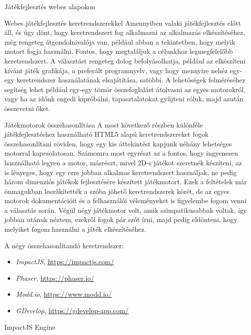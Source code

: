 \begin{MyChapter}{Játékfejlesztés webes alapokon}
\begin{MySection}{Webes játékfejlesztés keretrendszerekkel}
		Amennyiben valaki játékfejlesztés előtt áll, és úgy dönt, hogy keretrendszert fog alkalmazni az alkalmazás elkészítéséhez, még rengeteg átgondolnivalója van, például abban a tekintetben, hogy melyik motort fogja használni. Fontos, hogy megtaláljuk a célunkhoz legmegfelelőbb keretrendszert. A választást rengeteg dolog befolyásolhatja, például az elkészíteni kívánt játék grafikája, a preferált programnyelv, vagy hogy mennyire nehéz egy-egy keretrendszer használatának elsajátítása, satöbbi. A lehetőségek felméréséhez segítség lehet például egy-egy tömör összefoglalást átolvasni az egyes motorokról, vagy ha az időnk engedi kipróbálni, tapasztalatokat gyűjteni róluk, majd azután összevetni őket.
		
		\begin{MySubSection}{Játékmotorok összehasonlítása}
			A most következő részben különféle játékfejlesztéshez használható HTML5 alapú keretrendszereket fogok összehasonlítani röviden, hogy egy kis áttekintést kapjunk néhány lehetséges motorral kapcsolatosan. Számomra most egyrészt az a fontos, hogy ingyenesen használható legyen a motor, másrészt, mivel 2D-s játékot szeretnék készíteni, az is lényeges, hogy egy erre jobban alkalmas keretrendszert használjak, ne pedig három dimenziós játékok fejlesztésére készített játékmotort. 
			Ezek a feltételek már önmagukban leszűkítették a szóba jöhető keretrendszerek körét, de az egyes motorok dokumentációit és a felhasználói véleményeket is figyelembe fogom venni a választás során. Végül négy játékmotor volt, amik szimpatikusabbak voltak, így jobban utánuk néztem, ezekről fogok pár szót írni, majd pedig eldönteni, hogy melyiket fogom használni a játék elkészítéséhez.
			
			A négy összehasonlítandó keretrendszer:
			
			\begin{itemize}
				\item \textit{ImpactJS}, \url{https://impactjs.com/}
				\item \textit{Phaser}, \url{https://phaser.io/}
				\item \textit{Modd.io}, \url{https://www.modd.io/}
				\item \textit{GDevelop}, \url{https://gdevelop-app.com/}
			\end{itemize}
		\end{MySubSection}
	
		\begin{MySubSection}{ImpactJS Engine}
		\end{MySubSection}
	

\end{MySection}
\end{MyChapter}
